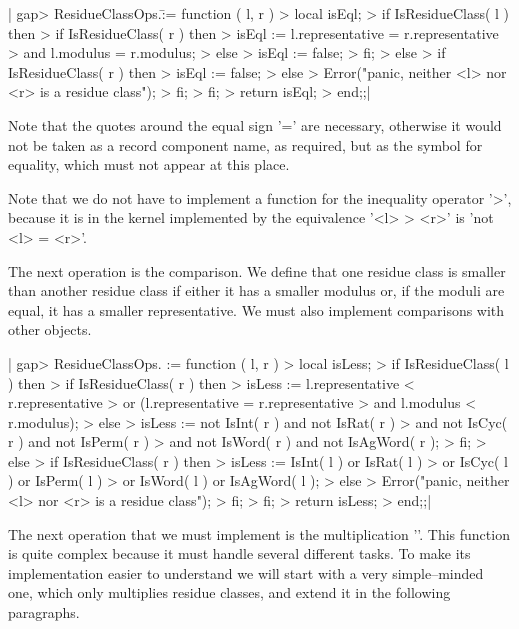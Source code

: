 |    gap> ResidueClassOps.\= := function ( l, r )
    >     local   isEql;
    >     if IsResidueClass( l )  then
    >         if IsResidueClass( r )  then
    >             isEql :=    l.representative = r.representative
    >                     and l.modulus        = r.modulus;
    >         else
    >             isEql := false;
    >         fi;
    >     else
    >         if IsResidueClass( r )  then
    >             isEql := false;
    >         else
    >             Error("panic, neither <l> nor <r> is a residue class");
    >         fi;
    >     fi;
    >     return isEql;
    > end;;|

Note that the quotes  around the equal sign  '=' are necessary, otherwise
it would not be taken as a record component name, as required, but as the
symbol for equality, which must not appear at this place.

Note  that  we do not   have to implement a   function for the inequality
operator  '\<>', because it  is in  the  {\GAP} kernel implemented by the
equivalence '<l> \<> <r>' is 'not <l> = <r>'.

The next operation is  the comparison.  We define that one residue  class
is smaller than another residue class if either it has  a smaller modulus
or, if  the moduli  are equal, it has a  smaller representative.  We must
also implement comparisons with other objects.

|    gap> ResidueClassOps.\< := function ( l, r )
    >     local   isLess;
    >     if IsResidueClass( l )  then
    >         if IsResidueClass( r )  then
    >             isLess :=   l.representative < r.representative
    >                     or (l.representative = r.representative
    >                         and l.modulus    < r.modulus);
    >         else
    >             isLess := not IsInt( r ) and not IsRat( r )
    >                   and not IsCyc( r ) and not IsPerm( r )
    >                   and not IsWord( r ) and not IsAgWord( r );
    >         fi;
    >     else
    >         if IsResidueClass( r )  then
    >             isLess :=  IsInt( l ) or IsRat( l )
    >                     or IsCyc( l ) or IsPerm( l )
    >                     or IsWord( l ) or IsAgWord( l );
    >         else
    >             Error("panic, neither <l> nor <r> is a residue class");
    >         fi;
    >     fi;
    >     return isLess;
    > end;;|

The next operation that  we must implement  is  the multiplication  '\*'.
This function  is quite complex because it must handle several  different
tasks.  To  make its implementation  easier to understand we  will  start
with a very  simple--minded  one, which only multiplies residue  classes,
and extend it in the following paragraphs.

